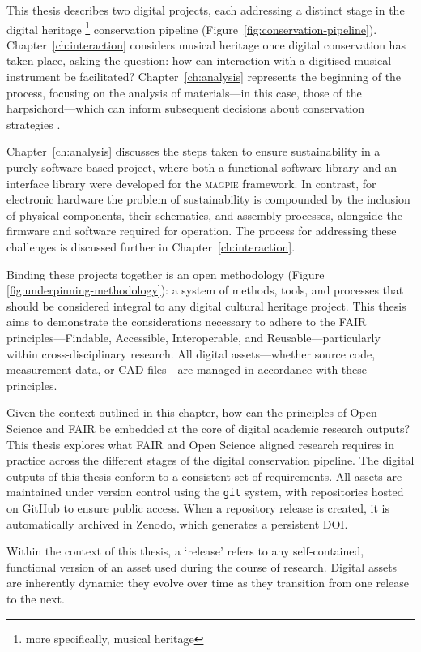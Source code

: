 This thesis describes two digital projects, each addressing a distinct stage in
the digital heritage
\footnote{more specifically, musical heritage} 
conservation pipeline (Figure~\ref{fig:conservation-pipeline}). Chapter~\ref{ch:interaction} considers musical
heritage once digital conservation has taken place, asking the question: how can
interaction with a digitised musical instrument be facilitated?
Chapter~\ref{ch:analysis} represents the beginning of the process, focusing on
the analysis of materials---in this case, those of the harpsichord---which can
inform subsequent decisions about conservation strategies
\cite{barclay_care_1997}.

Chapter~\ref{ch:analysis} discusses the steps taken to ensure sustainability in
a purely software-based project, where both a functional software library and an
interface library were developed for the \textsc{magpie} framework. In contrast,
for electronic hardware the problem of sustainability is compounded by the
inclusion of physical components, their schematics, and assembly processes,
alongside the firmware and software required for operation. The process for
addressing these challenges is discussed further in
Chapter~\ref{ch:interaction}.

Binding these projects together is an open methodology (Figure \ref{fig:underpinning-methodology}): a system of methods,
tools, and processes that should be considered integral to any digital cultural
heritage project. This thesis aims to demonstrate the considerations necessary
to adhere to the FAIR principles---Findable, Accessible, Interoperable, and
Reusable---particularly within cross-disciplinary research. All digital
assets---whether source code, measurement data, or CAD files---are managed in
accordance with these principles.

Given the context outlined in this chapter, how can the principles of Open Science and FAIR be embedded at the core of digital academic research outputs?
This thesis explores what FAIR and Open Science aligned research requires in practice across the different stages of the digital conservation pipeline.
The digital outputs of this thesis conform to a consistent set of requirements.
All assets are maintained under version control using the \texttt{git} system,
with repositories hosted on GitHub to ensure public access. When a repository
release is created, it is automatically archived in Zenodo, which generates a
persistent DOI. 

Within the context of this thesis, a `release' refers to any self-contained,
functional version of an asset used during the course of research. Digital
assets are inherently dynamic: they evolve over time as they transition from one
release to the next.


